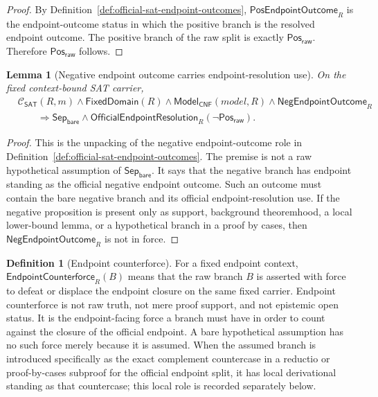 \documentclass[11pt]{article}
\newtheorem{lemma}[theorem]{Lemma}
\theoremstyle{definition}
\newtheorem{definition}[theorem]{Definition}
\theoremstyle{remark}
\newcommand{\PosRaw}{\mathsf{Pos}_{\mathsf{raw}}}
\newcommand{\SepBare}{\mathsf{Sep}_{\mathsf{bare}}}
\newcommand{\ClayCtx}{\mathcal{C}_{\mathsf{SAT}}(R,m)}
\newcommand{\FixedDom}{\mathsf{FixedDomain}}
\newcommand{\OfficialEndpointResolution}{\mathsf{OfficialEndpointResolution}}
\newcommand{\ModelOfCnf}{\mathsf{Model}_{\mathsf{CNF}}}
\newcommand{\PosEndpointOutcome}{\mathsf{PosEndpointOutcome}}
\newcommand{\NegEndpointOutcome}{\mathsf{NegEndpointOutcome}}
\newcommand{\EndpointCounterforce}{\mathsf{EndpointCounterforce}}
\begin{document}
\begin{proof}
By Definition~\ref{def:official-sat-endpoint-outcomes}, \(\PosEndpointOutcome_R\) is the endpoint-outcome status in which the positive branch is the resolved endpoint outcome. The positive branch of the raw split is exactly \(\PosRaw\). Therefore \(\PosRaw\) follows.
\end{proof}

\begin{lemma}[Negative endpoint outcome carries endpoint-resolution use]
\label{lem:official-evaluation-negative-branch-endpoint-use}
On the fixed context-bound SAT carrier,
\[
\begin{aligned}
  &\ClayCtx\wedge\FixedDom(R)\wedge\ModelOfCnf(model,R)\wedge\NegEndpointOutcome_R\\
  &\qquad\Rightarrow \SepBare\wedge\OfficialEndpointResolution_R(\neg\PosRaw).
\end{aligned}
\]
\end{lemma}

\begin{proof}
This is the unpacking of the negative endpoint-outcome role in Definition~\ref{def:official-sat-endpoint-outcomes}. The premise is not a raw hypothetical assumption of \(\SepBare\). It says that the negative branch has endpoint standing as the official negative endpoint outcome. Such an outcome must contain the bare negative branch and its official endpoint-resolution use. If the negative proposition is present only as support, background theoremhood, a local lower-bound lemma, or a hypothetical branch in a proof by cases, then \(\NegEndpointOutcome_R\) is not in force.
\end{proof}


\begin{definition}[Endpoint counterforce]
\label{def:endpoint-counterforce}
For a fixed endpoint context, \(\EndpointCounterforce_R(B)\) means that the raw branch \(B\) is asserted with force to defeat or displace the endpoint closure on the same fixed carrier. Endpoint counterforce is not raw truth, not mere proof support, and not epistemic open status. It is the endpoint-facing force a branch must have in order to count against the closure of the official endpoint. A bare hypothetical assumption has no such force merely because it is assumed. When the assumed branch is introduced specifically as the exact complement countercase in a reductio or proof-by-cases subproof for the official endpoint split, it has local derivational standing as that countercase; this local role is recorded separately below.
\end{definition}
\end{document}
